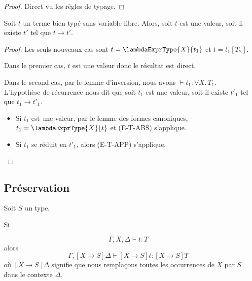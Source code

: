\begin{proof}
  Direct vu les règles de typage.
\end{proof}

\begin{theorem} [de progression]
  Soit $t$ un terme bien typé sans variable libre. Alors, soit $t$ est une
  valeur, soit il existe $t'$ tel que $t \rightarrow t'$.
\end{theorem}

\begin{proof}
  Les seuls nouveaux cas sont $t = \lambdaExprType{X}{t_{1}}$ et $t =
  t_{1}[T_{2}]$.

  Dans le premier cas, $t$ est une valeur donc le résultat est direct.

  Dans le second cas, par le lemme d'inversion, nous avons $\vdash t_{1} :
  \forall X . \, T_{1}$. L'hypothèse de récurrence nous dit que soit $t_{1}$ est
  une valeur, soit il existe $t'_{1}$ tel que $t_{1} \rightarrow t'_{1}$.

  \begin{itemize}
  \item Si $t_{1}$ est une valeur, par le lemme des formes canoniques, $t_{1} =
    \lambdaExprType{X}{t}$ et (E-T-ABS) s'applique.
  \item Si $t_{1}$ se réduit en $t'_{1}$, alors (E-T-APP) s'applique.
  \end{itemize}
\end{proof}

\subsection*{Préservation}

%
%
%
%  

\begin{lemma} 
  \label{thm:system-f-preservation-substitution-type}
  Soit $S$ un type.

  Si

  \begin{equation*}
    \Gamma, X, \Delta \vdash t : T
  \end{equation*}
  alors
  \begin{equation*}
    \Gamma, [X \rightarrow S]\Delta \vdash [X \rightarrow S]t : [X \rightarrow S] T 
  \end{equation*}
  où $[X \rightarrow S]\Delta$ signifie que nous remplaçons toutes les
  occurrences de $X$ par $S$ dans le contexte $\Delta$.
\end{lemma}

